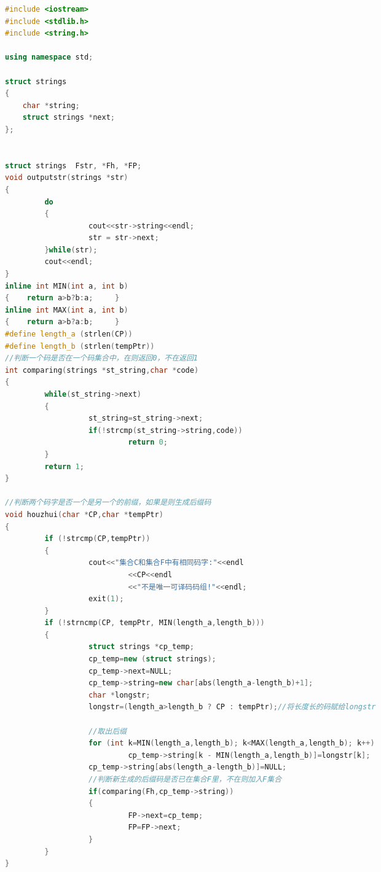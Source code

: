\documentclass[12pt,a4paper]{article}
\begin{document}
\begin{CJK}{UTF8}{gbsn}
\begin{lstlisting}[language=C++]
#include <iostream>
#include <stdlib.h>
#include <string.h>

using namespace std;

struct strings
{
    char *string;
    struct strings *next;
};


struct strings  Fstr, *Fh, *FP;
void outputstr(strings *str)
{                
         do
         {
                   cout<<str->string<<endl;
                   str = str->next;
         }while(str);
         cout<<endl;
}
inline int MIN(int a, int b)
{    return a>b?b:a;     }
inline int MAX(int a, int b)
{    return a>b?a:b;     }
#define length_a (strlen(CP))
#define length_b (strlen(tempPtr))
//判断一个码是否在一个码集合中，在则返回0，不在返回1
int comparing(strings *st_string,char *code)
{
         while(st_string->next)
         {
                   st_string=st_string->next;
                   if(!strcmp(st_string->string,code))
                            return 0;
         }
         return 1;
}
 
//判断两个码字是否一个是另一个的前缀，如果是则生成后缀码
void houzhui(char *CP,char *tempPtr)
{
         if (!strcmp(CP,tempPtr))
         {
                   cout<<"集合C和集合F中有相同码字:"<<endl
                            <<CP<<endl
                            <<"不是唯一可译码码组!"<<endl;
                   exit(1);
         }
         if (!strncmp(CP, tempPtr, MIN(length_a,length_b)))
         {                                            
                   struct strings *cp_temp;
                   cp_temp=new (struct strings);
                   cp_temp->next=NULL;
                   cp_temp->string=new char[abs(length_a-length_b)+1];                     
                   char *longstr;
                   longstr=(length_a>length_b ? CP : tempPtr);//将长度长的码赋给longstr
 
                   //取出后缀
                   for (int k=MIN(length_a,length_b); k<MAX(length_a,length_b); k++)
                            cp_temp->string[k - MIN(length_a,length_b)]=longstr[k];
                   cp_temp->string[abs(length_a-length_b)]=NULL;
                   //判断新生成的后缀码是否已在集合F里，不在则加入F集合
                   if(comparing(Fh,cp_temp->string))
                   {
                            FP->next=cp_temp;
                            FP=FP->next;
                   }
         }
}



\end{lstlisting}
\end{CJK}
\end{document}
